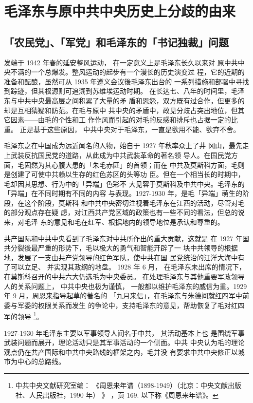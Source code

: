 \chapter{毛泽东与原中共中央历史上分歧的由来}
\section{ 「农民党」、「军党」和毛泽东的「书记独裁」问题}

发端于 1942 年春的延安整风运动，
在一定意义上是毛泽东长久以来对
原中共中央不满的一个总爆发。整风运动的起步有一个漫长的历史演变过
程，它的近期的准备和酝酿，虽然可从 1935 年遵义会议後毛泽东出台的
一系列措施和部署中寻找到踪迹，但其根源则可追溯到苏维埃运动时期。
在长达七、八年的时间里，毛泽东与中共中央最高层之间积累了大量的矛
盾和恩怨，双方既有过合作，但更多的却是互相猜疑和防范。在毛与原中
共中央的矛盾中，政见分歧占突出地位，但其它因素——由毛的个性和工
作作风而引起的对毛的反感和排斥也占据一定的比重。
正是基于这些原因，
中共中央对于毛泽东，一直是欲用不能、欲弃不舍。

毛泽东之在中国成为远近闻名的人物，始自于 1927 年秋率众上了井
冈山，最先走上武装反抗国民党的道路，从此成为中共武装革命的著名领
导人。在国民党方面，毛固然为其心腹大患的「朱毛赤匪」的首领；而在
中共及莫斯科方面，毛则是创建了可使中共赖以生存的红色苏区的头等功
臣。但在一个相当长的时期中，毛却因其思想、行为中的「异端」色彩不
大见容于莫斯科及中共中央。毛泽东的「异端」在不同时期有不同的内容
与表现。1927-1930 年，是毛「异端」萌生的阶段，在这个阶段，莫斯科
和中共中央密切注视着毛泽东在江西的活动，尽管对毛的部分观点存在疑
虑，对江西共产党区域的政策也有一些不同的看法，但总的说来，对毛泽
东的意见和毛在红军、根据地内的领导地位是承认和尊重的。

共产国际和中共中央看到了毛泽东对中共所作出的重大贡献，这就是
在 1927 年国共分裂後最严重的形势下，毛以极大的勇气和智能开辟了一
块中共领导的根据地，发展了一支由共产党领导的红色军队，使中共在国
民党统治的汪洋大海中有了可以立足、
并实现其政纲的地盘。
1928 年 6 月，
在毛泽东未出席的情况下，在莫斯科召开的中共六大仍选毛为中央委员。
在处理毛泽东与其他重要军政领导人的关系问题上，
中共中央也极为谨慎，
一般都以维护毛泽东的威信为重。1929 年 9 月，周恩来指导起草的著名的
「九月来信」，在毛泽东与朱德间就红四军中前委与军委的权限关系而发生
的争论中，支持毛泽东的意见，帮助恢复了毛对红四军的领导
\footnote{中共中央文献研究室编：
《周恩来年谱（1898-1949）（北京：中央文献出版社、人民出版社，1990 年）
》
，页 169.
以下称《周恩来年谱》。}。

1927-1930 年毛泽东主要以军事领导人闻名于中共，
其活动基本上也
是围绕军事武装问题而展开，理论活动只是其军事活动的一个侧面。中共
中央认为毛的理论观点仍在共产国际和中共中央路线的框架之内，毛并没
有要求中共中央修正以城市为中心的总路线。

